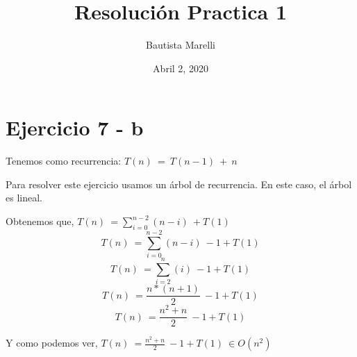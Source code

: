 \documentclass[12]{article}
\begin{document}
  \title{Resolución Practica 1}
  \author{Bautista Marelli}
  \date{Abril 2, 2020}
  \maketitle
  \section{Ejercicio 7 - b}
  Tenemos como recurrencia: $T(n)\ =\ T(n - 1)\ +\ n$

  Para resolver este ejercicio usamos un árbol de recurrencia. En este caso, el árbol
  es lineal.

  Obtenemos que, $T(n)\ = \sum_{i = 0}^{n - 2} (n-i)\ + T(1)$
      $$T(n)\ = \sum_{i = 0}^{n - 2} (n-i)\ - 1 + T(1)$$
      $$T(n)\ = \sum_{i = 2}^{n} (i)\ - 1+ T(1)$$
      $$T(n)\ = \frac{n*(n+1)}{2}\ - 1 + T(1)$$
      $$T(n)\ = \frac{n^2 + n}{2} \  - 1 + T(1)$$
  
  Y como podemos ver, $T(n)\ = \frac{n^2 + n}{2} \  - 1 + T(1) \ \in O(n^2)$
  
\end{document}
